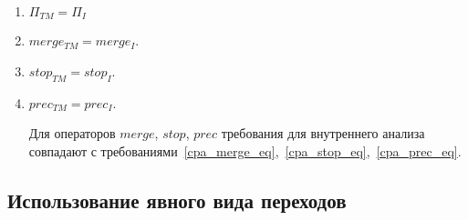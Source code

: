 \begin{enumerate}
\begin{proof}
Действительно, рассмотрим случайный переход $\tau \tcarrow \tau'$, $\tau \in \conc{R}$.
Нужно показать, что $\exists k: \tau' \in Reach^k(R)$.
Так как $\tau \in \conc{R}$ по определению $\conc{R}$~\ref{cpa_conc_tm_def} это означает, что $\exists t, t_1, \dots, t_n \in T, t_i \neq t_j, e_0, e_1, \dots, e_n \in R:$\\
$\tau \in \epp_I
\left(
\begin{pmatrix}
e_0 \\
t_0 
\end{pmatrix},
\left\{
\begin{pmatrix}
e_1 \\
t_1 
\end{pmatrix} ,
\dots ,
\begin{pmatrix}
e_n \\
t_n 
\end{pmatrix}
\right\}
\right)$.

По условию на внутренние операторы~\ref{cpa_transfer_inner_req} это означает, что найдутся такие элементы $e'_0, e'_1, \dots, e'_n \in E$, которые могут быть получены за два шага: 
\begin{enumerate}
\item применение оператора $transfer$ и оператора $apply$ для перехода в текущем потоке;
\item применение оператора $transfer$ к переходам в окружении, которые были получены на предудыщем шаге с помощью оператора $apply$.
\end{enumerate}
\end{proof}
И для этих элементов $e'_0, e'_1, \dots, e'_n$ будет выполнено $\tau' \in \epp_I((e_i', t_i), \{(e_0', t_0), \dots, (e_n', t_n)\})$.
То есть, показано, что $\exists k=2: \tau' \in Reach^k(R)$.

\item $\Pi_{TM} = \Pi_{I}$
\item $merge_{TM} = merge_{I}$.
\item $stop_{TM} = stop_{I}$.
\item $prec_{TM} = prec_{I}$.

Для операторов $merge$, $stop$, $prec$ требования для внутреннего анализа совпадают с требованиями~\ref{cpa_merge_eq},~\ref{cpa_stop_eq},~\ref{cpa_prec_eq}.
\end{enumerate}

\subsection{Использование явного вида переходов}
\label{subsect_transitions}


